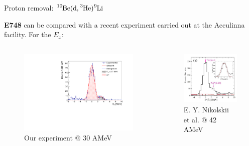 \documentclass[sans,
frameno, %
mp,
usenames,dvipsnames, %
onlytextwidth, %
t,%
11pt]{beamer}
\newcommand{\iso}[2]{\ce{^{#1}#2}}
\begin{document}
\begin{frame}{Proton removal: $\iso{10}{Be}(\textrm{d}, \iso{3}{He})\iso{9}{Li}$}
    {
        \textbf{E748} can be compared with a recent experiment carried out at the Acculinna facility. For the $E_{x}$:
        \begin{columns}[t]
            {
                \begin{figure}
                    \captionsetup{belowskip=-8pt}
                    \centering
                    \caption{Our experiment @ \qty{30}{} AMeV}
                    \includegraphics[width=\linewidth, cfbox=myorange 1pt 0pt 0pt]{figures/Workshop/10Be_d3He_ex.pdf}
                \end{figure}
            }
            \hfill
            {
                \begin{figure}
                    \centering
                    \captionsetup{belowskip=2pt}
                    \caption{E. Y. Nikolskii et al. @ 42 AMeV}
                    \includegraphics[height=0.41\textheight, cfbox=Mulberry 1pt 1pt]{figures/acculina_new.png}

\end{figure}}
\end{columns}}
\end{frame}
\end{document}
